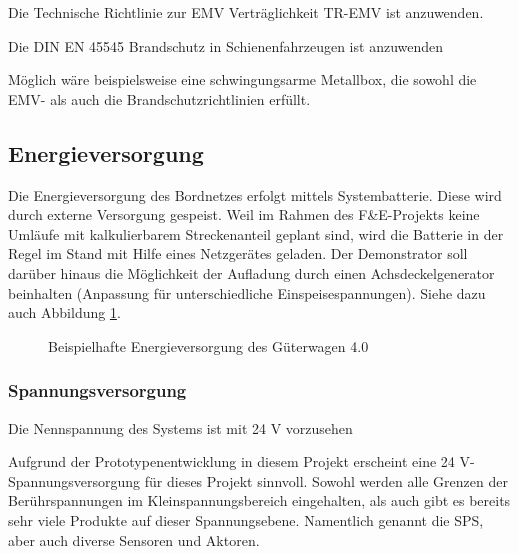 \begin{feat}
Die Technische Richtlinie zur EMV Verträglichkeit TR-EMV ist anzuwenden.
\end{feat}
\begin{feat}
Die \acrshort{DIN} \acrshort{EN} 45545 Brandschutz in Schienenfahrzeugen ist anzuwenden
\end{feat}
\begin{rem}[zu Anf. 6-8]
Möglich wäre beispielsweise eine schwingungsarme Metallbox, die sowohl die EMV- als auch die Brandschutzrichtlinien erfüllt.
\end{rem}

\subsection{Energieversorgung}\label{sec:EV}
Die Energieversorgung des Bordnetzes erfolgt mittels Systembatterie. Diese wird durch externe Versorgung gespeist. Weil im Rahmen des F\&E-Projekts keine Umläufe mit kalkulierbarem Streckenanteil geplant sind, wird die Batterie in der Regel im Stand mit Hilfe eines Netzgerätes geladen. Der Demonstrator soll darüber hinaus die Möglichkeit der Aufladung durch einen Achsdeckelgenerator beinhalten (Anpassung für unterschiedliche Einspeisespannungen). Siehe dazu auch Abbildung \ref{fig:Soll-EV}. 
\begin{figure}[htp]
    \centering
    
    \caption{Beispielhafte Energieversorgung des Güterwagen 4.0}
    \label{fig:Soll-EV}
\end{figure}

\subsubsection{Spannungsversorgung}
\begin{feat}
Die Nennspannung des Systems ist mit 24 V vorzusehen
\end{feat}
\begin{rem}[zu Anf. 9]
Aufgrund der Prototypenentwicklung in diesem Projekt erscheint eine 24 V-Spannungsversorgung für dieses Projekt sinnvoll. Sowohl werden alle Grenzen der Berührspannungen im Kleinspannungsbereich eingehalten, als auch gibt es bereits sehr viele Produkte auf dieser Spannungsebene. Namentlich genannt die SPS, aber auch diverse Sensoren und Aktoren.
\end{rem}
